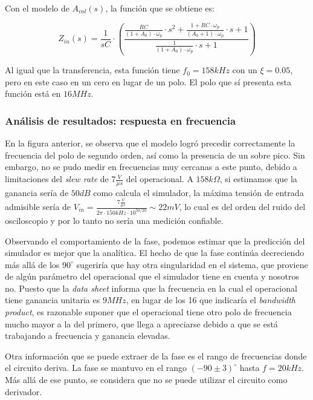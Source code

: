 \documentclass[../../main.tex]{subfiles}
\begin{document}
Con el modelo de $A_{vol}(s)$, la funci\'on que se obtiene es:

\[ Z_{in}(s) = \frac{1}{sC} \cdot \left( \frac{ \frac{RC}{(1+A_0)\cdot \omega_p} \cdot s^2 + \frac{1 + RC \cdot \omega_p}{(A_0+1) \cdot \omega_p} \cdot s + 1 }{\frac{1}{(1+A_0)\cdot\omega_p}\cdot s+1 } \right)\]	

Al igual que la transferencia, esta funci\'on tiene $f_0 = 158kHz$ con un $\xi = 0.05$, pero en este caso en un cero en lugar de un polo. El polo que s\'i presenta esta funci\'on est\'a en $16MHz$. 



\subsubsection{An\'alisis de resultados: respuesta en frecuencia} \label{ssection:d-hf}


En la figura anterior, se observa que el modelo logr\'o precedir correctamente la frecuencia del polo de segundo orden, as\'i como la presencia de un sobre pico. Sin embargo, no se pudo medir en frecuencias muy cercanas a este punto, debido a limitaciones del \textit{slew rate} de $7\frac{V}{\mu s}$ del operacional. A $158k\Omega$, si estimamos que la ganancia ser\'ia de $50dB$ como calcula el simulador, la m\'axima tensi\'on de entrada admisible ser\'ia de $V_{in} = \frac{7\frac{V}{\mu s}}{2\pi \cdot 150kHz \cdot 10^{50/20}}\sim 22mV$, lo cual es del orden del ruido del osciloscopio y por lo tanto no ser\'ia una medici\'on confiable.\par

Observando el comportamiento de la fase, podemos estimar que la predicci\'on del simulador es mejor que la anal\'itica. El hecho de que la fase contin\'ua decreciendo m\'as all\'a de los $90^\circ$ sugerir\'ia que hay otra singularidad en el sistema, que proviene de alg\'un par\'ametro del operacional que el simulador tiene en cuenta y nosotros no. Puesto que la \textit{data sheet} informa que la frecuencia en la cual el operacional tiene ganancia unitaria es $9MHz$, en lugar de los 16 que indicar\'ia el \textit{bandwidth product}, es razonable suponer que el operacional tiene otro polo de frecuencia mucho mayor a la del primero, que llega a apreciarse debido a que se est\'a trabajando a frecuencia y ganancia elevadas.\par 

Otra informaci\'on que se puede extraer de la fase es el rango de frecuencias donde el circuito deriva. La fase se mantuvo en el rango $(-90\pm 3)^\circ$ hasta $f = 20kHz$. M\'as all\'a de ese punto, se considera que no se puede utilizar el circuito como derivador. 
\end{document}
